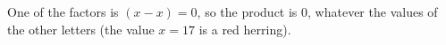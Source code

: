 One of the factors is $(x-x)=0$, so the product is $\boxed{0}$, whatever the values of the other letters (the value $x=17$ is a red herring).
